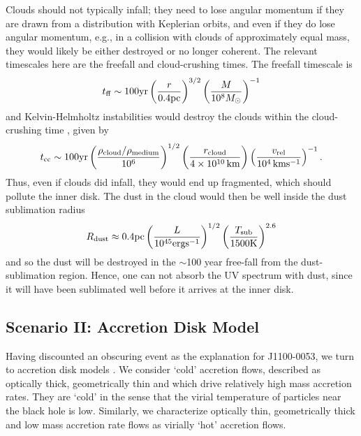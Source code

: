 \documentclass[a4paper,fleqn,usenatbib]{mnras}
\begin{document}
Clouds should not typically infall; they need to lose angular momentum
if they are drawn from a distribution with Keplerian orbits, and even
if they do lose angular momentum, e.g., in a collision with clouds of 
approximately equal mass, they would likely be either destroyed or no
longer coherent. The relevant timescales here are the freefall and
cloud-crushing times. The freefall timescale is 
\begin{equation}
    t_{{\rm ff}}   \sim 100   {\rm yr}  
                     \left( \frac{ r } {0.4\rm{pc} }\right)^{3/2} 
                                            \left(\frac{M}{10^{8}M_{\odot}}\right)^{-1}
\end{equation}
and Kelvin-Helmholtz instabilities would destroy the clouds within the
cloud-crushing time \citep[e.g., ][]{Nagakura2008, Hopkins2013,
Shiokawa2015, Bae2016}, given by
\begin{equation}
    t_{\rm cc} \sim 100{\rm yr} \left(\frac{\rho_{{\rm cloud}}/\rho_{{\rm medium}}} {10^{6}}\right)^{1/2} 
                                            \left(\frac{r_{\rm cloud}}{4 \times 10^{10} \, \rm{km}}\right) 
                                            \left(\frac{v_{\rm rel}}{10^{4} \, \rm{km s^{-1}}}\right)^{-1}.
\label{eqn:T_cloudcrushing}
\end{equation}
Thus, even if clouds did infall, they would end up fragmented, which
should pollute the inner disk.  The dust in the cloud would then be
well inside the dust sublimation radius 
\begin{equation}
    R_{\rm dust} \approx 0.4{\rm pc}\left(\frac{L}{10^{45}\rm{erg s^{-1}}}\right)^{1/2}
                                                   \left(\frac{T_{\rm sub}}{1500\rm{K}}\right)^{2.6}
\end{equation}
and so the dust will be destroyed in the $\sim$100 year free-fall from
the dust-sublimation region. Hence, one can not absorb the UV spectrum
with dust, since it will have been sublimated well before it arrives
at the inner disk.


\subsection{Scenario II: Accretion Disk Model}
Having discounted an obscuring event as the explanation for
J1100-0053, we turn to accretion disk models \citep[see also the
recent review by ][]{YuanNarayan2014}. We consider `cold' accretion
flows, described as optically thick, geometrically thin and which drive
relatively high mass accretion rates. They are `cold' in the sense
that the virial temperature of particles near the black hole is
low. Similarly, we characterize optically thin, geometrically thick
and low mass accretion rate flows as virially `hot' accretion flows.
\end{document}
